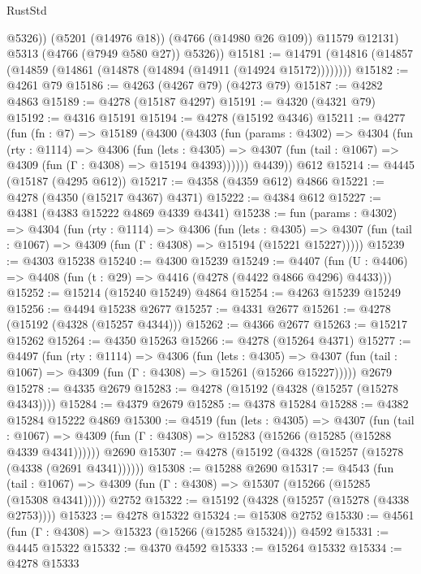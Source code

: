 \begin{lexlean}{RustStd}
\begin{coremodule}
{\begin{coremodule}
{{{{{{{{{{{{{{{{{{{{{{{{{{{{{{{{{{{              @5326))
          (@5201 (@14976 @18))
          (@4766 (@14980 @26 @109))
          @11579
          @12131)
        @5313
        (@4766 (@7949 @580 @27))
        @5326))
@15181 := @14791 (@14816 (@14857 (@14859 (@14861 (@14878 (@14894 (@14911 (@14924 @15172))))))))
@15182 := @4261 @79
@15186 := @4263 (@4267 @79) (@4273 @79)
@15187 := @4282 @4863
@15189 := @4278 (@15187 @4297)
@15191 := @4320 (@4321 @79)
@15192 := @4316 @15191
@15194 := @4278 (@15192 @4346)
@15211 := @4277
    (fun (fn : @7) =>
    @15189
      (@4300
        (@4303
          (fun (params : @4302) =>
          @4304
            (fun (rty : @1114) =>
            @4306
              (fun (lets : @4305) =>
              @4307 (fun (tail : @1067) => @4309 (fun (Γ : @4308) => @15194 @4393))))))
        @4439))
    @612
@15214 := @4445 (@15187 (@4295 @612))
@15217 := @4358 (@4359 @612) @4866
@15221 := @4278 (@4350 (@15217 @4367) @4371)
@15222 := @4384 @612
@15227 := @4381 (@4383 @15222 @4869 @4339 @4341)
@15238 := fun (params : @4302) =>
  @4304
    (fun (rty : @1114) =>
    @4306
      (fun (lets : @4305) =>
      @4307 (fun (tail : @1067) => @4309 (fun (Γ : @4308) => @15194 (@15221 @15227)))))
@15239 := @4303 @15238
@15240 := @4300 @15239
@15249 := @4407
    (fun (U : @4406) => @4408 (fun (t : @29) => @4416 (@4278 (@4422 @4866 @4296) @4433)))
@15252 := @15214 (@15240 @15249) @4864
@15254 := @4263 @15239 @15249
@15256 := @4494 @15238 @2677
@15257 := @4331 @2677
@15261 := @4278 (@15192 (@4328 (@15257 @4344)))
@15262 := @4366 @2677
@15263 := @15217 @15262
@15264 := @4350 @15263
@15266 := @4278 (@15264 @4371)
@15277 := @4497
    (fun (rty : @1114) =>
    @4306
      (fun (lets : @4305) =>
      @4307 (fun (tail : @1067) => @4309 (fun (Γ : @4308) => @15261 (@15266 @15227)))))
    @2679
@15278 := @4335 @2679
@15283 := @4278 (@15192 (@4328 (@15257 (@15278 @4343))))
@15284 := @4379 @2679
@15285 := @4378 @15284
@15288 := @4382 @15284 @15222 @4869
@15300 := @4519
    (fun (lets : @4305) =>
    @4307
      (fun (tail : @1067) =>
      @4309 (fun (Γ : @4308) => @15283 (@15266 (@15285 (@15288 @4339 @4341))))))
    @2690
@15307 := @4278 (@15192 (@4328 (@15257 (@15278 (@4338 (@2691 @4341))))))
@15308 := @15288 @2690
@15317 := @4543
    (fun (tail : @1067) => @4309 (fun (Γ : @4308) => @15307 (@15266 (@15285 (@15308 @4341)))))
    @2752
@15322 := @15192 (@4328 (@15257 (@15278 (@4338 @2753))))
@15323 := @4278 @15322
@15324 := @15308 @2752
@15330 := @4561 (fun (Γ : @4308) => @15323 (@15266 (@15285 @15324))) @4592
@15331 := @4445 @15322
@15332 := @4370 @4592
@15333 := @15264 @15332
@15334 := @4278 @15333
}}}}}}}}}}}}}}}}}}}}}}}}}}}}}}}}}}}
\end{coremodule}}
\end{coremodule}
\end{lexlean}
